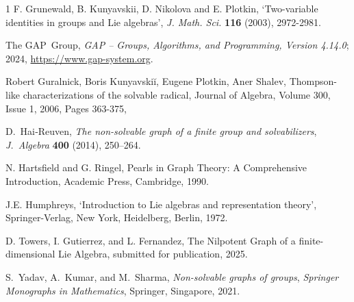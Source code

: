 \documentclass[11pt]{amsart}
\theoremstyle{plain}
\begin{document}
\begin{thebibliography}{1}
 F. Grunewald, B. Kunyavskii, D. Nikolova and E. Plotkin,  `Two-variable identities in groups and Lie algebras', {\it J. Math. Sci.} {\bf 116} (2003), 2972-2981.

   The GAP~Group, \emph{GAP -- Groups, Algorithms, and Programming,   Version 4.14.0}; 2024, \url{https://www.gap-system.org}.

 Robert Guralnick, Boris Kunyavskiĭ, Eugene Plotkin, Aner Shalev, Thompson-like characterizations of the solvable radical, Journal of Algebra, Volume 300, Issue 1, 2006, Pages 363-375,

 D.~Hai‐Reuven, \textit{The non-solvable graph of a finite group and solvabilizers}, \emph{J.\ Algebra} \textbf{400} (2014), 250–264.

 N. Hartsfield and G. Ringel,  Pearls in Graph Theory: A Comprehensive Introduction, Academic Press, Cambridge, 1990.


 J.E. Humphreys, `Introduction to Lie algebras and representation theory', Springer-Verlag, New York, Heidelberg, Berlin, 1972.

 D. Towers, I. Gutierrez, and L. Fernandez, The Nilpotent Graph of a finite-dimensional Lie Algebra, submitted for publication, 2025.

 S.~Yadav, A.~Kumar, and M.~Sharma, \textit{Non-solvable graphs of groups}, \emph{Springer Monographs in Mathematics}, Springer, Singapore, 2021.
\end{thebibliography}
\end{document}
